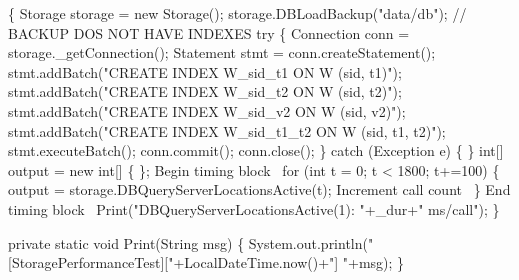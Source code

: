 \documentclass{article}
\def\nwendcode{\endtrivlist \endgroup}
\let\nwdocspar=\par
\begin{document}
\nwenddocs{}\endmoddef{}
\{
  Storage storage = new Storage();
  storage.DBLoadBackup("data/db");
  // BACKUP DOS NOT HAVE INDEXES
  try \{
    Connection conn = storage._getConnection();
    Statement stmt = conn.createStatement();
    stmt.addBatch("CREATE INDEX W_sid_t1 ON W (sid, t1)");
    stmt.addBatch("CREATE INDEX W_sid_t2 ON W (sid, t2)");
    stmt.addBatch("CREATE INDEX W_sid_v2 ON W (sid, v2)");
    stmt.addBatch("CREATE INDEX W_sid_t1_t2 ON W (sid, t1, t2)");
    stmt.executeBatch();
    conn.commit();
    conn.close();
  \} catch (Exception e) \{ \}
  int[] output = new int[] \{ \};
  \LA{}Begin timing block~{\nwtagstyle{}}\RA{}
  for (int t = 0; t < 1800; t+=100) \{
    output = storage.DBQueryServerLocationsActive(t);
    \LA{}Increment call count~{\nwtagstyle{}}\RA{}
  \}
  \LA{}End timing block~{\nwtagstyle{}}\RA{}
  Print("DBQueryServerLocationsActive(1): "+_dur+" ms/call");
\}
\nwendcode{}\nwdocspar

\nwenddocs{}\endmoddef{}
private static void Print(String msg) \{
  System.out.println("[StoragePerformanceTest]["+LocalDateTime.now()+"] "+msg);
\}
\nwendcode{}
\end{document}
